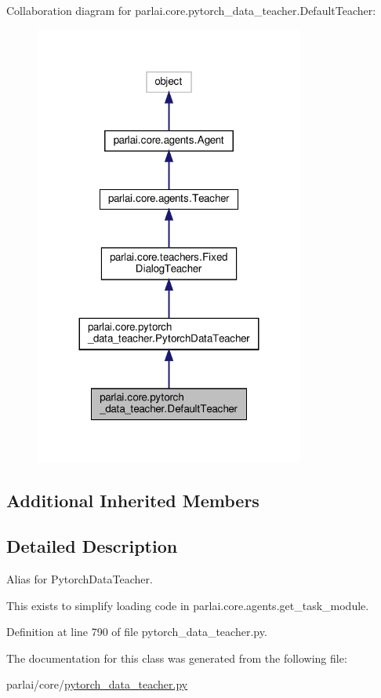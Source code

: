 Collaboration diagram for parlai.\+core.\+pytorch\+\_\+data\+\_\+teacher.\+Default\+Teacher\+:
\nopagebreak
\begin{figure}[H]
\begin{center}
\leavevmode
\includegraphics[width=251pt]{classparlai_1_1core_1_1pytorch__data__teacher_1_1DefaultTeacher__coll__graph}
\end{center}
\end{figure}
\subsection*{Additional Inherited Members}


\subsection{Detailed Description}
\begin{DoxyVerb}Alias for PytorchDataTeacher.

This exists to simplify loading code in parlai.core.agents.get_task_module.
\end{DoxyVerb}
 

Definition at line 790 of file pytorch\+\_\+data\+\_\+teacher.\+py.



The documentation for this class was generated from the following file\+:\begin{DoxyCompactItemize}
\item 
parlai/core/\hyperlink{pytorch__data__teacher_8py}{pytorch\+\_\+data\+\_\+teacher.\+py}\end{DoxyCompactItemize}
